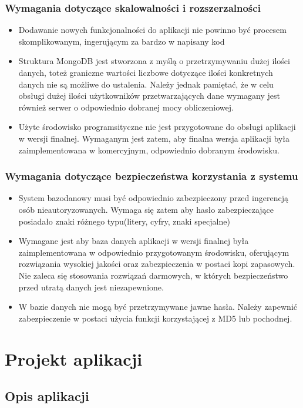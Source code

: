 \documentclass[eng,printmode]{mgr}
\begin{document}
\subsection{Wymagania dotyczące skalowalności i rozszerzalności}
\begin{itemize}
  \item Dodawanie nowych funkcjonalności do aplikacji nie powinno być procesem skomplikowanym, ingerującym za bardzo w napisany kod
  \item Struktura MongoDB jest stworzona z myślą o przetrzymywaniu dużej ilości danych, toteż graniczne wartości liczbowe dotyczące ilości konkretnych danych nie są możliwe do ustalenia. Należy jednak pamiętać, że w celu obsługi dużej ilości użytkowników przetwarzających dane wymagany jest również serwer o odpowiednio dobranej mocy obliczeniowej.
  \item Użyte środowisko programsityczne nie jest przygotowane do obsługi aplikacji w wersji finalnej. Wymaganym jest zatem, aby finalna wersja aplikacji była zaimplementowana w komercyjnym, odpowiednio dobranym środowisku.
\end{itemize}
\subsection{Wymagania dotyczące bezpieczeństwa korzystania z systemu}
\begin{itemize}
  \item System bazodanowy musi być odpowiednio zabezpieczony przed ingerencją osób nieautoryzowanych. Wymaga się zatem aby hasło zabezpieczające posiadało znaki różnego typu(litery, cyfry, znaki specjalne)
  \item Wymagane jest aby baza danych aplikacji w wersji finalnej była zaimplementowana w odpowiednio przygotowanym środowisku, oferującym rozwiązania wysokiej jakości oraz zabezpieczenia w postaci kopi zapasowych. Nie zaleca się stosowania rozwiązań darmowych, w których bezpieczeństwo przed utratą danych jest niezapewnione.
  \item W bazie danych nie mogą być przetrzymywane jawne hasła. Należy zapewnić zabezpieczenie w postaci użycia funkcji korzystającej z MD5\cite {MD5} lub pochodnej.
\end{itemize}
\chapter{Projekt aplikacji}
\section{Opis aplikacji}
\end{document}
